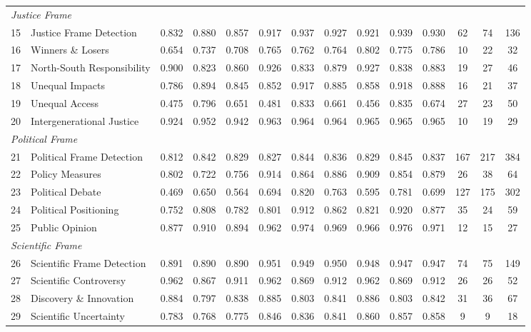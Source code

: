 {\begin{longtable}{p{0.4cm}p{5.5cm}cccccccccccc}
\multicolumn{14}{l}{\textit{Justice Frame}} \\
15 & Justice Frame Detection & 0.832 & 0.880 & 0.857 & 0.917 & 0.937 & 0.927 & 0.921 & 0.939 & 0.930 & 62 & 74 & 136 \\
16 & Winners \& Losers & 0.654 & 0.737 & 0.708 & 0.765 & 0.762 & 0.764 & 0.802 & 0.775 & 0.786 & 10 & 22 & 32 \\
17 & North-South Responsibility & 0.900 & 0.823 & 0.860 & 0.926 & 0.833 & 0.879 & 0.927 & 0.838 & 0.883 & 19 & 27 & 46 \\
18 & Unequal Impacts & 0.786 & 0.894 & 0.845 & 0.852 & 0.917 & 0.885 & 0.858 & 0.918 & 0.888 & 16 & 21 & 37 \\
19 & Unequal Access & 0.475 & 0.796 & 0.651 & 0.481 & 0.833 & 0.661 & 0.456 & 0.835 & 0.674 & 27 & 23 & 50 \\
20 & Intergenerational Justice & 0.924 & 0.952 & 0.942 & 0.963 & 0.964 & 0.964 & 0.965 & 0.965 & 0.965 & 10 & 19 & 29 \\
\midrule
\multicolumn{14}{l}{\textit{Political Frame}} \\
21 & Political Frame Detection & 0.812 & 0.842 & 0.829 & 0.827 & 0.844 & 0.836 & 0.829 & 0.845 & 0.837 & 167 & 217 & 384 \\
22 & Policy Measures & 0.802 & 0.722 & 0.756 & 0.914 & 0.864 & 0.886 & 0.909 & 0.854 & 0.879 & 26 & 38 & 64 \\
23 & Political Debate & 0.469 & 0.650 & 0.564 & 0.694 & 0.820 & 0.763 & 0.595 & 0.781 & 0.699 & 127 & 175 & 302 \\
24 & Political Positioning & 0.752 & 0.808 & 0.782 & 0.801 & 0.912 & 0.862 & 0.821 & 0.920 & 0.877 & 35 & 24 & 59 \\
25 & Public Opinion & 0.877 & 0.910 & 0.894 & 0.962 & 0.974 & 0.969 & 0.966 & 0.976 & 0.971 & 12 & 15 & 27 \\
\midrule
\multicolumn{14}{l}{\textit{Scientific Frame}} \\
26 & Scientific Frame Detection & 0.891 & 0.890 & 0.890 & 0.951 & 0.949 & 0.950 & 0.948 & 0.947 & 0.947 & 74 & 75 & 149 \\
27 & Scientific Controversy & 0.962 & 0.867 & 0.911 & 0.962 & 0.869 & 0.912 & 0.962 & 0.869 & 0.912 & 26 & 26 & 52 \\
28 & Discovery \& Innovation & 0.884 & 0.797 & 0.838 & 0.885 & 0.803 & 0.841 & 0.886 & 0.803 & 0.842 & 31 & 36 & 67 \\
29 & Scientific Uncertainty & 0.783 & 0.768 & 0.775 & 0.846 & 0.836 & 0.841 & 0.860 & 0.857 & 0.858 & 9 & 9 & 18 \\

\end{longtable}}
